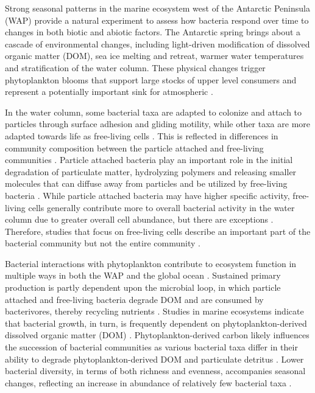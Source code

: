 Strong seasonal patterns in the marine ecosystem west of the Antarctic Peninsula (WAP) provide a natural experiment to assess how bacteria respond over time to changes in both biotic and abiotic factors. The Antarctic spring brings about a cascade of environmental changes, including light-driven modification of dissolved organic matter (DOM), sea ice melting and retreat, warmer water temperatures and stratification of the water column. These physical changes trigger phytoplankton blooms that support large stocks of upper level consumers \citep{Smetacek2005-tz} and represent a potentially important sink for atmospheric  \citep{Arrigo2008-xp}.

In the water column, some bacterial taxa are adapted to colonize and attach to particles through surface adhesion and gliding motility, while other taxa are more adapted towards life as free-living cells \citep{dang2016}. This is reflected in differences in community composition between the particle attached and free-living communities \citep{delong1993phylogenetic, Ortega-Retuerta2013freeliving, rieck2015freeliving}. Particle attached bacteria play an important role in the initial degradation of particulate matter, hydrolyzing polymers and releasing smaller molecules that can diffuse away from particles and be utilized by free-living bacteria \citep{dang2016}. While particle attached bacteria may have higher specific activity, free-living cells generally contribute more to overall bacterial activity in the water column due to greater overall cell abundance, but there are exceptions \citep{iriberri1987, turley1994freeliving, rieck2015freeliving}. Therefore, studies that focus on free-living cells describe an important part of the bacterial community but not the entire community \citep{Teeling2012-jz, williams2013role, Sunagawa1261359}.

Bacterial interactions with phytoplankton contribute to ecosystem function in multiple ways in both the WAP and the global ocean \citep{Cole1982-yp, Croft2005-em, Sher2011-op}. Sustained primary production is partly dependent upon the microbial loop, in which particle attached and free-living bacteria degrade DOM and are consumed by bacterivores, thereby recycling nutrients \citep{Azam1983-wo}. Studies in marine ecosystems indicate that bacterial growth, in turn, is frequently dependent on phytoplankton-derived dissolved organic matter (DOM) \citep{Church2000-wc, Moran2001-ot, Morn2002-cx, Piquet2011-ot, dsvse12, Kim2014-oj}. Phytoplankton-derived carbon likely influences the succession of bacterial communities as various bacterial taxa differ in their ability to degrade phytoplankton-derived DOM and particulate detritus \citep{Kerkhof1999-nr, Pinhassi2004-kc, Teeling2012-jz}. Lower bacterial diversity, in terms of both richness and evenness, accompanies seasonal changes, reflecting an increase in abundance of relatively few bacterial taxa \citep{Gilbert2012-ta, Ladau2013-ro}.

